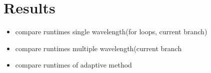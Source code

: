 \section{Results}
	\begin{itemize}
	\item compare runtimes single wavelength(for loops, current branch)
	\item compare runtimes multiple wavelength(current branch
	\item compare runtimes of adaptive method
	\end{itemize}
